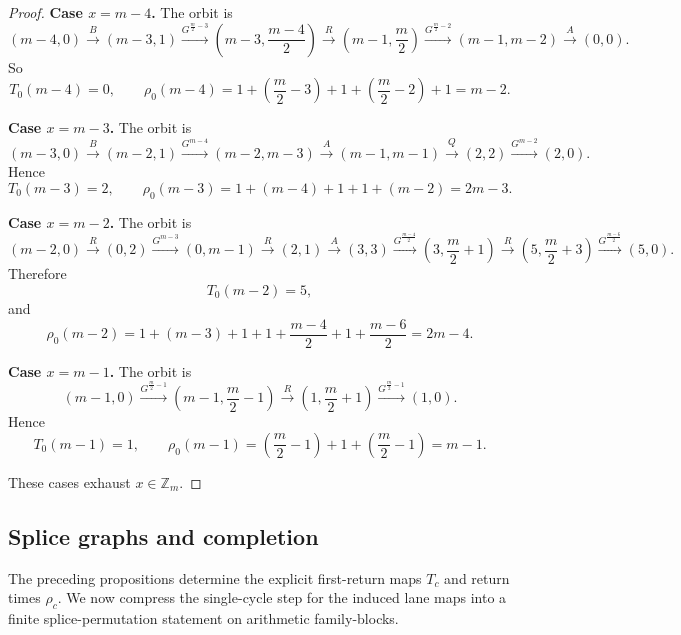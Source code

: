 \documentclass[11pt]{article}
\newcommand{\Zm}{\mathbb Z_m}
\begin{document}
\begin{proof}
\smallskip
\noindent\textbf{Case $x=m-4$.}
The orbit is
\[
(m-4,0)\xrightarrow{B}(m-3,1)\xrightarrow{G^{\frac m2-3}}\left(m-3,\frac{m-4}{2}\right)
\xrightarrow{R}\left(m-1,\frac m2\right)\xrightarrow{G^{\frac m2-2}}(m-1,m-2)\xrightarrow{A}(0,0).
\]
So
\[
T_0(m-4)=0,\qquad
\rho_0(m-4)=1+\left(\frac m2-3\right)+1+\left(\frac m2-2\right)+1=m-2.
\]

\smallskip
\noindent\textbf{Case $x=m-3$.}
The orbit is
\[
(m-3,0)\xrightarrow{B}(m-2,1)\xrightarrow{G^{m-4}}(m-2,m-3)\xrightarrow{A}(m-1,m-1)
\xrightarrow{Q}(2,2)\xrightarrow{G^{m-2}}(2,0).
\]
Hence
\[
T_0(m-3)=2,\qquad
\rho_0(m-3)=1+(m-4)+1+1+(m-2)=2m-3.
\]

\smallskip
\noindent\textbf{Case $x=m-2$.}
The orbit is
\[
(m-2,0)\xrightarrow{R}(0,2)\xrightarrow{G^{m-3}}(0,m-1)\xrightarrow{R}(2,1)\xrightarrow{A}(3,3)
\xrightarrow{G^{\frac{m-4}{2}}}\left(3,\frac m2+1\right)\xrightarrow{R}\left(5,\frac m2+3\right)
\xrightarrow{G^{\frac{m-6}{2}}}(5,0).
\]
Therefore
\[
T_0(m-2)=5,
\]
and
\[
\rho_0(m-2)=1+(m-3)+1+1+\frac{m-4}{2}+1+\frac{m-6}{2}=2m-4.
\]

\smallskip
\noindent\textbf{Case $x=m-1$.}
The orbit is
\[
(m-1,0)\xrightarrow{G^{\frac m2-1}}\left(m-1,\frac m2-1\right)\xrightarrow{R}\left(1,\frac m2+1\right)
\xrightarrow{G^{\frac m2-1}}(1,0).
\]
Hence
\[
T_0(m-1)=1,\qquad
\rho_0(m-1)=\left(\frac m2-1\right)+1+\left(\frac m2-1\right)=m-1.
\]

These cases exhaust $x\in \Zm$.
\end{proof}


\subsection{Splice graphs and completion}

The preceding propositions determine the explicit first-return maps $T_c$ and return times $\rho_c$.
We now compress the single-cycle step for the induced lane maps into a finite splice-permutation statement on arithmetic family-blocks.
\end{document}
